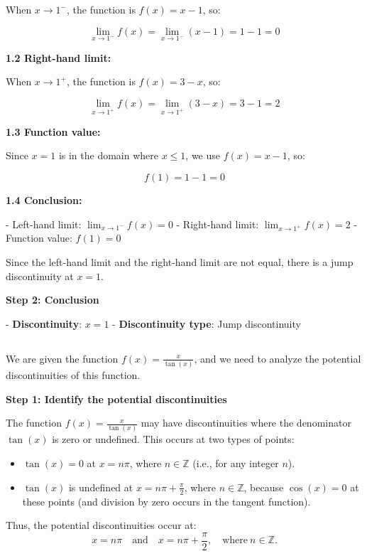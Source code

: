 \documentclass{article}
\begin{document}
	When \(x \to 1^{-}\), the function is \(f(x) = x - 1\), so:
	
	\[
	\lim_{x \to 1^{-}} f(x) = \lim_{x \to 1^{-}} (x - 1) = 1 - 1 = 0
	\]
	
	\textbf{1.2 Right-hand limit:}
	
	When \(x \to 1^{+}\), the function is \(f(x) = 3 - x\), so:
	
	\[
	\lim_{x \to 1^{+}} f(x) = \lim_{x \to 1^{+}} (3 - x) = 3 - 1 = 2
	\]
	
	\textbf{1.3 Function value:}
	
	Since \(x = 1\) is in the domain where \(x \leq 1\), we use \(f(x) = x - 1\), so:
	
	\[
	f(1) = 1 - 1 = 0
	\]
	
	\textbf{1.4 Conclusion:}
	
	- Left-hand limit: \(\lim_{x \to 1^{-}} f(x) = 0\)
	- Right-hand limit: \(\lim_{x \to 1^{+}} f(x) = 2\)
	- Function value: \(f(1) = 0\)
	
	Since the left-hand limit and the right-hand limit are not equal, there is a jump discontinuity at \(x = 1\).
	
	\textbf{Step 2: Conclusion}
	
	- \textbf{Discontinuity}: \(x = 1\)
	- \textbf{Discontinuity type}: Jump discontinuity
	
		
	\subsection{}
We are given the function \( f(x) = \frac{x}{\tan(x)} \), and we need to analyze the potential discontinuities of this function.

\textbf{Step 1: Identify the potential discontinuities}

The function \( f(x) = \frac{x}{\tan(x)} \) may have discontinuities where the denominator \( \tan(x) \) is zero or undefined. This occurs at two types of points:
\begin{itemize}
	\item \( \tan(x) = 0 \) at \( x = n\pi \), where \( n \in \mathbb{Z} \) (i.e., for any integer \( n \)).
	\item \( \tan(x) \) is undefined at \( x = n\pi + \frac{\pi}{2} \), where \( n \in \mathbb{Z} \), because \( \cos(x) = 0 \) at these points (and division by zero occurs in the tangent function).
\end{itemize}

Thus, the potential discontinuities occur at:
\[
x = n\pi \quad \text{and} \quad x = n\pi + \frac{\pi}{2}, \quad \text{where} \ n \in \mathbb{Z}.
\]
\end{document}
